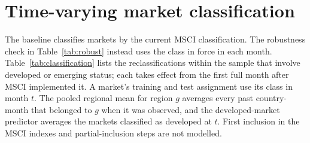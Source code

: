 \documentclass[11pt]{article}
\begin{document}
\clearpage
\section{Time-varying market classification}
\label{app:classification}

The baseline classifies markets by the current MSCI classification. The robustness check in Table~\ref{tab:robust} instead uses the class in force in each month. Table~\ref{tab:classification} lists the reclassifications within the sample that involve developed or emerging status; each takes effect from the first full month after MSCI implemented it. A market's training and test assignment use its class in month $t$. The pooled regional mean for region $g$ averages every past country-month that belonged to $g$ when it was observed, and the developed-market predictor averages the markets classified as developed at $t$. First inclusion in the MSCI indexes and partial-inclusion steps are not modelled.


\end{document}
